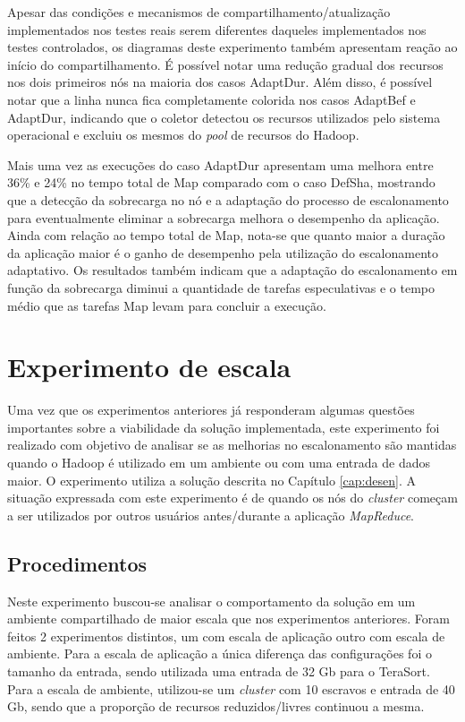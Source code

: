 Apesar das condições e mecanismos de compartilhamento/atualização implementados nos testes reais serem diferentes daqueles implementados nos testes controlados, os diagramas deste experimento também apresentam reação ao início do compartilhamento. É possível notar uma redução gradual dos recursos nos dois primeiros nós na maioria dos casos AdaptDur. Além disso, é possível notar que a linha nunca fica completamente colorida nos casos AdaptBef e AdaptDur, indicando que o coletor detectou os recursos utilizados pelo sistema operacional e excluiu os mesmos do \textit{pool} de recursos do Hadoop.

Mais uma vez as execuções do caso AdaptDur apresentam uma melhora entre 36\% e 24\% no tempo total de Map comparado com o caso DefSha, mostrando que a detecção da sobrecarga no nó e a adaptação do processo de escalonamento para eventualmente eliminar a sobrecarga melhora o desempenho da aplicação. Ainda com relação ao tempo total de Map, nota-se que quanto maior a duração da aplicação maior é o ganho de desempenho pela utilização do escalonamento adaptativo. Os resultados também indicam que a adaptação do escalonamento em função da sobrecarga diminui a quantidade de tarefas especulativas e o tempo médio que as tarefas Map levam para concluir a execução. 


\section{Experimento de escala}
Uma vez que os experimentos anteriores já responderam algumas questões importantes sobre a viabilidade da solução implementada, este experimento foi realizado com objetivo de analisar se as melhorias no escalonamento são mantidas quando o Hadoop é utilizado em um ambiente ou com uma entrada de dados maior. O experimento utiliza a solução descrita no Capítulo \ref{cap:desen}. A situação expressada com este experimento é de quando os nós do \textit{cluster} começam a ser utilizados por outros usuários antes/durante a aplicação \textit{MapReduce}.

\subsection{Procedimentos}
Neste experimento buscou-se analisar o comportamento da solução em um ambiente compartilhado de maior escala que nos experimentos anteriores. Foram feitos 2 experimentos distintos, um com escala de aplicação outro com escala de ambiente. Para a escala de aplicação a única diferença das configurações foi o tamanho da entrada, sendo utilizada uma entrada de 32 Gb para o TeraSort. Para a escala de ambiente, utilizou-se um \textit{cluster} com 10 escravos e entrada de 40 Gb, sendo que a proporção de recursos reduzidos/livres continuou a mesma. 

